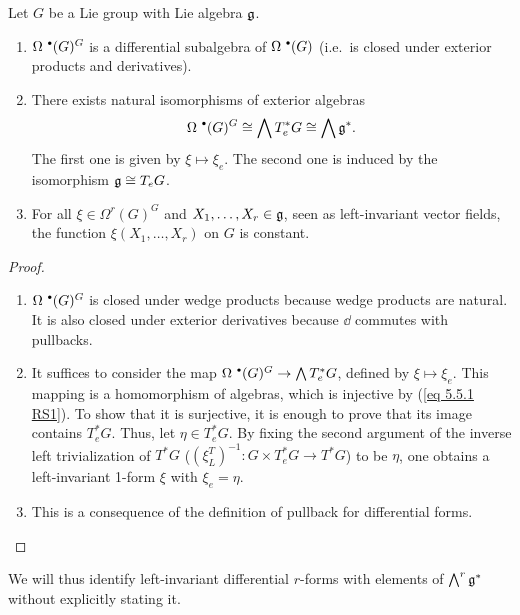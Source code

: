 \begin{prop}[{{\cite[Prop.~5.5.2]{RS1}}}]\label{prop 5.5.2 RS1}
    Let $G$ be a Lie group with Lie algebra $\mathfrak{g}$.
    \begin{enumerate}
        \item $\Omega^{\smbullet }(G)^G$ is a differential subalgebra of $\Omega^{\smbullet }(G)$ (i.e.~is closed under exterior products and derivatives).
        \item There exists natural isomorphisms of exterior algebras
        \[\Omega^{\smbullet }(G)^G\cong \bigwedge T^\ast_e G\cong \bigwedge \frakg^\ast.\]
        The first one is given by $\xi\mapsto \xi_e$. The second one is induced by the isomorphism $\mathfrak{g}\cong T_eG$.
        \item For all $\xi\in\Omega^r(G)^G$ and $X_1,\ldots,X_r\in\mathfrak{g}$, seen as left-invariant vector fields, the function $\xi(X_1,\ldots,X_r)$ on $G$ is constant.
    \end{enumerate}
\end{prop}
\begin{proof}
    \begin{enumerate}
        \item $\Omega^{\smbullet }(G)^G$ is closed under wedge products because wedge products are natural. It is also closed under exterior derivatives because $\dd$ commutes with pullbacks.
        \item It suffices to consider the map $\Omega^{\smbullet }(G)^G\to\bigwedge T^\ast_e G$, defined by $\xi\mapsto\xi_e$. This mapping is a homomorphism of algebras, which is injective by (\ref{eq 5.5.1 RS1}). To show that it is surjective, it is enough to prove that its image contains $T^\ast_e G$. Thus, let $\eta\in T^\ast_e G$. By fixing the second argument of the inverse left trivialization of $T^\ast G$ ($(\xi_L^T)^{-1}:G\times T_e^\ast G\to T^\ast G$) to be $\eta$, one obtains a left-invariant 1-form $\xi$ with $\xi_e=\eta$.
        \item  This is a consequence of the definition of pullback for differential forms.
    \end{enumerate}
\end{proof}

We will thus identify left-invariant differential $r$-forms with elements of $\bigwedge^r\mathfrak{g}^\ast$ without explicitly stating it. 


